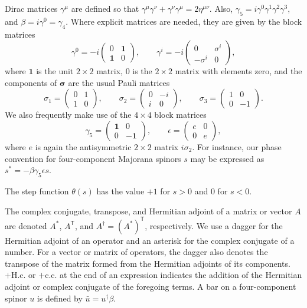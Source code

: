Dirac matrices \(\gamma^\mu\) are defined so that
\(\gamma^\mu\gamma^\nu+\gamma^\nu\gamma^\mu=2\eta^{\mu\nu}\). Also,
\(\gamma_5=i\gamma^0\gamma^1\gamma^2\gamma^3\), and
\(\beta=i\gamma^0=\gamma_4\). Where explicit matrices are needed, they are
given by the block matrices
\[
  \gamma^0=-i
  \begin{pmatrix}
    0 & \mathbf{1}\\
    \mathbf{1} & 0
  \end{pmatrix},
  \qquad
  \gamma^i=-i
  \begin{pmatrix}
    0 & \sigma^i\\
    -\sigma^i & 0
  \end{pmatrix},
\]
where \(\mathbf{1}\) is the unit \(2\times2\) matrix, \(0\) is the
\(2\times2\) matrix with elements zero, and the components of \(\boldsymbol
\sigma\) are the usual Pauli matrices
\[
  \sigma_1=
  \begin{pmatrix}
    0 & 1\\
    1 & 0
  \end{pmatrix},
  \qquad
  \sigma_2=
  \begin{pmatrix}
    0 & -i\\
    i & 0
  \end{pmatrix},
  \qquad
  \sigma_3=
  \begin{pmatrix}
    1 & 0\\
    0 & -1
  \end{pmatrix}.
\]
We also frequently make use of the \(4\times4\) block matrices
\[
  \gamma_5=
  \begin{pmatrix}
    \mathbf{1} & 0\\
    0 & -\mathbf{1}
  \end{pmatrix},
  \qquad
  \epsilon=
  \begin{pmatrix}
    e & 0\\
    0 & e
  \end{pmatrix},
\]
where \(e\) is again the antisymmetric \(2\times2\) matrix \(i\sigma_2\).
For instance, our phase convention for four-component Majorana spinors \(s\)
may be expressed as \(s^*=-\beta\gamma_5\epsilon s\).

The step function \(\theta(s)\) has the value \(+1\) for \(s>0\) and \(0\) for
\(s<0\).

The complex conjugate, transpose, and Hermitian adjoint of a matrix or vector
\(A\) are denoted \(A^*\), \(A^{\mathsf T}\), and
\(A^\dagger=(A^*)^{\mathsf T}\), respectively. We use a dagger for the
Hermitian adjoint of an operator and an asterisk for the complex conjugate of a
number. For a vector or matrix of operators, the dagger also denotes the
transpose of the matrix formed from the Hermitian adjoints of its components.
\(+\mathrm{H.c.}\) or \(+\mathrm{c.c.}\) at the end of an expression indicates
the addition of the Hermitian adjoint or complex conjugate of the foregoing
terms. A bar on a four-component spinor \(u\) is defined by
\(\bar u=u^\dagger\beta\).

